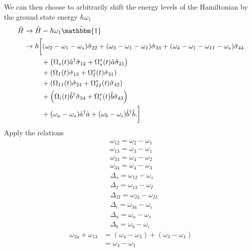 \documentclass[aps,pra,showpacs,amsmath,amssymb,nofootinbib,longbibliography,superscriptaddress
]{revtex4-1}
\theoremstyle{definition}
\theoremstyle{remark}
\newcommand{\0}{\hat{0}}
\begin{document}
We can then choose to arbitrarily shift the energy levels of the Hamiltonian by the ground state energy $\hbar \omega_1$
\begin{align}
    \tilde{H}
    &\rightarrow
    \tilde{H} - \hbar \omega_1 \hat{\mathbbm{1}} \nonumber \\
    &\rightarrow
    \hbar \biggl[
        (\omega_2 - \omega_1 - \omega_s) \hat{\sigma}_{22} +
        (\omega_3 - \omega_1 - \omega_I) \hat{\sigma}_{33} +
        (\omega_4 - \omega_1 - \omega_{II} - \omega_s) \hat{\sigma}_{44} \nonumber \\
        &\;\;\;\;\;\;\;\;\;+
        \left(
            \Omega_{s}(t) \hat{a}^{\dagger} \hat{\sigma}_{12} +
            \Omega_{s}^*(t) \hat{a} \hat{\sigma}_{21}
        \right) \nonumber \\
        &\;\;\;\;\;\;\;\;\;+
        \left(
            \Omega_{I}(t) \hat{\sigma}_{13} +
            \Omega_{I}^*(t) \hat{\sigma}_{31}
        \right)\nonumber \\
        &\;\;\;\;\;\;\;\;\;+
        \left(
            \Omega_{II}(t) \hat{\sigma}_{24} +
            \Omega_{II}^*(t) \hat{\sigma}_{42}
        \right) \nonumber \\
        &\;\;\;\;\;\;\;\;\;+
        \left(
            \Omega_{i}(t) \hat{b}^{\dagger} \hat{\sigma}_{34} +
            \Omega_{i}^*(t) \hat{b} \hat{\sigma}_{43}
        \right) \nonumber \\
        &\;\;\;\;\;\;\;\;\;+
        (\omega_{a} - \omega_s) \hat{a}^{\dagger}\hat{a} +
        (\omega_{b} - \omega_i) \hat{b}^{\dagger}\hat{b}.
    \biggr]
\end{align}
Apply the relations
\begin{align}
    &\omega_{12} = \omega_2 - \omega_1\\
    &\omega_{13} = \omega_3 - \omega_1\\
    &\omega_{24} = \omega_4 - \omega_2\\
    &\omega_{34} = \omega_4 - \omega_3\\
    &\Delta_s = \omega_{12} - \omega_s\\
    &\Delta_I = \omega_{13} - \omega_I\\
    &\Delta_{II} = \omega_{24} - \omega_{II}\\
    &\Delta_i = \omega_{34} - \omega_i\\
    &\Delta_a = \omega_{a} - \omega_s\\
    &\Delta_b = \omega_{b} - \omega_i
\end{align}
\begin{align}
    \omega_{34} + \omega_{13} &= (\omega_4 - \omega_3) + (\omega_3 - \omega_1)\nonumber \\
    &= \omega_4 - \omega_1
\end{align}
\end{document}
